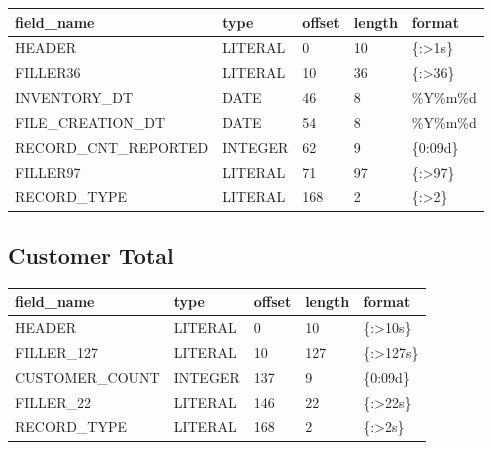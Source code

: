 \documentclass[letterpaper,10pt,english]{sphinxmanual}
\begin{document}
\begin{savenotes}\sphinxattablestart
\centering
\begin{tabulary}{\linewidth}[t]{|T|T|T|T|T|}
\hline
\sphinxstyletheadfamily 
field\_name
&\sphinxstyletheadfamily 
type
&\sphinxstyletheadfamily 
offset
&\sphinxstyletheadfamily 
length
&\sphinxstyletheadfamily 
format
\\
\hline
HEADER
&
LITERAL
&
0
&
10
&
\{:\textgreater{}1s\}
\\
\hline
FILLER36
&
LITERAL
&
10
&
36
&
\{:\textgreater{}36\}
\\
\hline
INVENTORY\_DT
&
DATE
&
46
&
8
&
\%Y\%m\%d
\\
\hline
FILE\_CREATION\_DT
&
DATE
&
54
&
8
&
\%Y\%m\%d
\\
\hline
RECORD\_CNT\_REPORTED
&
INTEGER
&
62
&
9
&
\{0:09d\}
\\
\hline
FILLER97
&
LITERAL
&
71
&
97
&
\{:\textgreater{}97\}
\\
\hline
RECORD\_TYPE
&
LITERAL
&
168
&
2
&
\{:\textgreater{}2\}
\\
\hline
\end{tabulary}
\par
\sphinxattableend\end{savenotes}


\subsection{Customer Total}
\label{\detokenize{cds_record_layout:customer-total}}

\begin{savenotes}\sphinxattablestart
\centering
\begin{tabulary}{\linewidth}[t]{|T|T|T|T|T|}
\hline
\sphinxstyletheadfamily 
field\_name
&\sphinxstyletheadfamily 
type
&\sphinxstyletheadfamily 
offset
&\sphinxstyletheadfamily 
length
&\sphinxstyletheadfamily 
format
\\
\hline
HEADER
&
LITERAL
&
0
&
10
&
\{:\textgreater{}10s\}
\\
\hline
FILLER\_127
&
LITERAL
&
10
&
127
&
\{:\textgreater{}127s\}
\\
\hline
CUSTOMER\_COUNT
&
INTEGER
&
137
&
9
&
\{0:09d\}
\\
\hline
FILLER\_22
&
LITERAL
&
146
&
22
&
\{:\textgreater{}22s\}
\\
\hline
RECORD\_TYPE
&
LITERAL
&
168
&
2
&
\{:\textgreater{}2s\}
\\
\hline
\end{tabulary}
\par
\sphinxattableend\end{savenotes}
\end{document}

